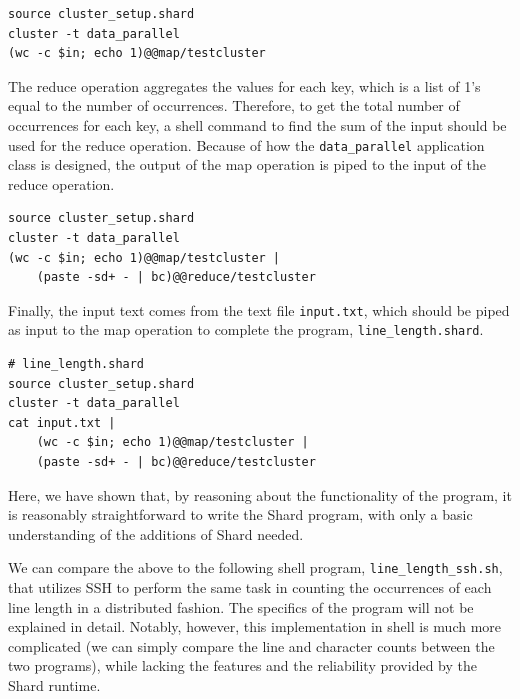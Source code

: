 \documentclass[twoside]{report}
\begin{document}
\begin{minipage}[c]{\textwidth-15pt}
  \begin{lstlisting}[language=Shard]
source cluster_setup.shard
cluster -t data_parallel
(wc -c $in; echo 1)@@map/testcluster
\end{lstlisting}
  \smallskip
\end{minipage}

The reduce operation aggregates the values for each key, which is a list of 1's equal to the number of occurrences.
Therefore, to get the total number of occurrences for each key, a shell command to find the sum of the input should be used for the reduce operation.
Because of how the \texttt{data\_parallel} application class is designed, the output of the map operation is piped to the input of the reduce operation.

\begin{minipage}[c]{\textwidth-15pt}
  \begin{lstlisting}[language=Shard]
source cluster_setup.shard
cluster -t data_parallel
(wc -c $in; echo 1)@@map/testcluster |
    (paste -sd+ - | bc)@@reduce/testcluster
\end{lstlisting}
  \smallskip
\end{minipage}

Finally, the input text comes from the text file \texttt{input.txt}, which should be piped as input to the map operation to complete the program, \texttt{line\_length.shard}.

\begin{minipage}[c]{\textwidth-15pt}
  \begin{lstlisting}[language=Shard]
# line_length.shard
source cluster_setup.shard
cluster -t data_parallel
cat input.txt |
    (wc -c $in; echo 1)@@map/testcluster |
    (paste -sd+ - | bc)@@reduce/testcluster
\end{lstlisting}
  \smallskip
\end{minipage}

Here, we have shown that, by reasoning about the functionality of the program, it is reasonably straightforward to write the Shard program, with only a basic understanding of the additions of Shard needed.

We can compare the above to the following shell program, \texttt{line\_length\_ssh.sh}, that utilizes SSH to perform the same task in counting the occurrences of each line length in a distributed fashion.
The specifics of the program will not be explained in detail.
Notably, however, this implementation in shell is much more complicated (we can simply compare the line and character counts between the two programs), while lacking the features and the reliability provided by the Shard runtime.
\end{document}
